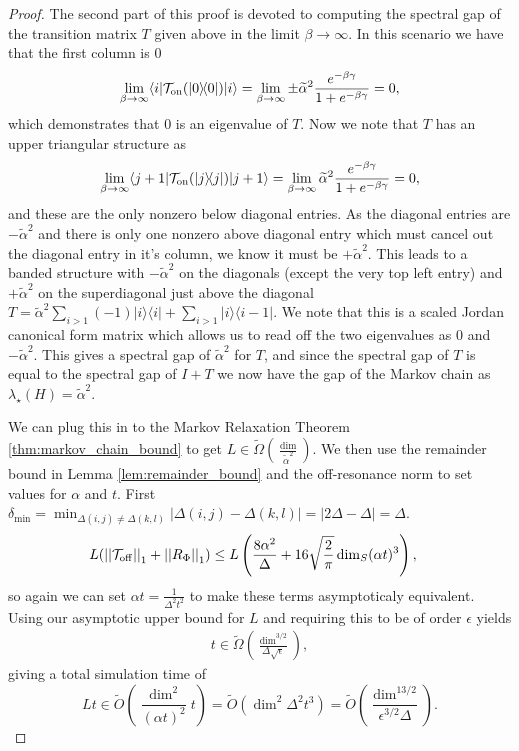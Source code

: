 \documentclass{article}
\newcommand{\on}{\rm on}
\newcommand{\off}{\rm off}
\newcommand{\ket}[1]{|#1\rangle}
\newcommand{\bra}[1]{\langle #1|}
\newcommand{\ketbra}[2]{| #1\rangle\! \langle #2|}
\newcommand{\parens}[1]{\left( #1 \right)}
\newcommand{\norm}[1]{\left| \left| #1 \right| \right|}
\newcommand{\bigotilde}[1]{\widetilde{O} \left( #1 \right)}
\begin{document}
\begin{proof}
The second part of this proof is devoted to computing the spectral gap of the transition matrix $T$ given above in the limit $\beta \to \infty$. In this scenario we have that the first column is 0 
\begin{equation}
\lim_{\beta \to \infty} \bra{i} \mathcal{T}_{\on}(\ketbra{0}{0})\ket{i} = \lim_{\beta \to \infty} \pm \widetilde{\alpha}^2 \frac{e^{-\beta \gamma}}{1 + e^{-\beta \gamma}} = 0,
\end{equation}
which demonstrates that 0 is an eigenvalue of $T$. Now we note that $T$ has an upper triangular structure as 
\begin{equation}
\lim_{\beta \to \infty} \bra{j + 1} \mathcal{T}_{\on}(\ketbra{j}{j})\ket{j + 1} = \lim_{\beta \to \infty} \widetilde{\alpha}^2 \frac{e^{-\beta \gamma}}{1 + e^{-\beta \gamma}} = 0,
\end{equation}
and these are the only nonzero below diagonal entries. As the diagonal entries are $-\widetilde{\alpha}^2$ and there is only one nonzero above diagonal entry which must cancel out the diagonal entry in it's column, we know it must be $+\widetilde{\alpha}^2$. This leads to a banded structure with $-\widetilde{\alpha}^2$ on the diagonals (except the very top left entry) and $+ \widetilde{\alpha}^2$ on the superdiagonal just above the diagonal $T = \widetilde{\alpha}^2 \sum_{i > 1}(-1) \ketbra{i}{i} + \sum_{i > 1} \ketbra{i}{i - 1} $. We note that this is a scaled Jordan canonical form matrix which allows us to read off the two eigenvalues as 0 and $- \widetilde{\alpha}^2$. This gives a spectral gap of $\widetilde{\alpha}^2$ for $T$, and since the spectral gap of $T$ is equal to the spectral gap of $I  + T$ we now have the gap of the Markov chain as $\lambda_{\star}(H) = \widetilde{\alpha}^2$.

We can plug this in to the Markov Relaxation Theorem \ref{thm:markov_chain_bound} to get $L \in \widetilde{\Omega}\left( \frac{\dim}{\widetilde{\alpha}^2}\right)$. We then use the remainder bound in Lemma \ref{lem:remainder_bound} and the off-resonance norm to set values for $\alpha$ and $t$. First $\delta_{\min} = \min_{\Delta(i,j) \neq \Delta(k,l)} |\Delta(i,j) - \Delta(k,l)| = |2 \Delta - \Delta| = \Delta$.
\begin{align}
  L(\norm{\mathcal{T}_{\off}}_1 + \norm{R_{\Phi}}_1) &\le L \left(\frac{8 \alpha^2}{\Delta} + 16 \sqrt{\frac{2}{\pi}} \dim_S (\alpha t)^3 \right),
\end{align}
so again we can set $\alpha t = \frac{1}{\Delta^2 t^2}$ to make these terms asymptoticaly equivalent. Using our asymptotic upper bound for $L$ and requiring this to be of order $\epsilon$ yields
\begin{align}
    t \in \widetilde{\Omega} \left( \frac{\dim^{3/2}}{\Delta \sqrt{\epsilon}} \right),
\end{align}
giving a total simulation time of 
\begin{equation}
    L t \in \bigotilde{\frac{\dim^2}{(\alpha t)^2} t} = \bigotilde{ \dim^2 \Delta^2 t^3} = \widetilde{O} \parens{\frac{\dim^{13/2}}{\epsilon^{3/2} \Delta} }.
\end{equation}
\end{proof}
\end{document}

